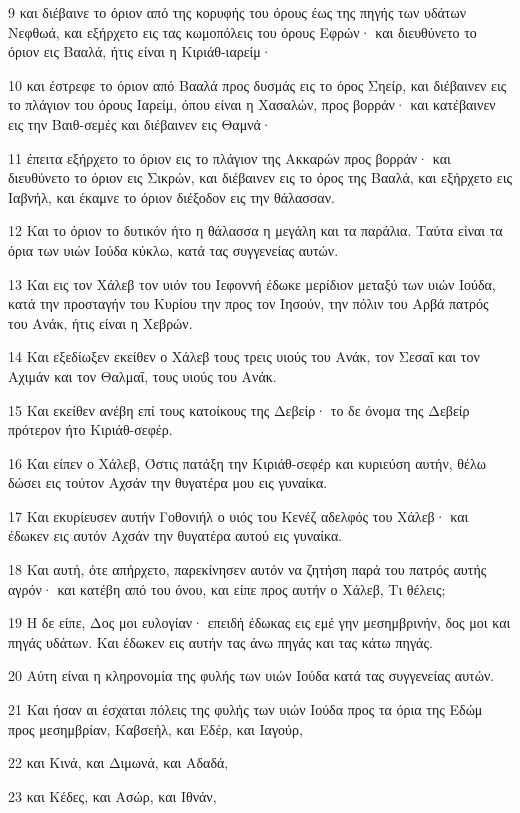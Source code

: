 \par 9 και διέβαινε το όριον από της κορυφής του όρους έως της πηγής των υδάτων Νεφθωά, και εξήρχετο εις τας κωμοπόλεις του όρους Εφρών· και διευθύνετο το όριον εις Βααλά, ήτις είναι η Κιριάθ-ιαρείμ·
\par 10 και έστρεφε το όριον από Βααλά προς δυσμάς εις το όρος Σηείρ, και διέβαινεν εις το πλάγιον του όρους Ιαρείμ, όπου είναι η Χασαλών, προς βορράν· και κατέβαινεν εις την Βαιθ-σεμές και διέβαινεν εις Θαμνά·
\par 11 έπειτα εξήρχετο το όριον εις το πλάγιον της Ακκαρών προς βορράν· και διευθύνετο το όριον εις Σικρών, και διέβαινεν εις το όρος της Βααλά, και εξήρχετο εις Ιαβνήλ, και έκαμνε το όριον διέξοδον εις την θάλασσαν.
\par 12 Και το όριον το δυτικόν ήτο η θάλασσα η μεγάλη και τα παράλια. Ταύτα είναι τα όρια των υιών Ιούδα κύκλω, κατά τας συγγενείας αυτών.
\par 13 Και εις τον Χάλεβ τον υιόν του Ιεφοννή έδωκε μερίδιον μεταξύ των υιών Ιούδα, κατά την προσταγήν του Κυρίου την προς τον Ιησούν, την πόλιν του Αρβά πατρός του Ανάκ, ήτις είναι η Χεβρών.
\par 14 Και εξεδίωξεν εκείθεν ο Χάλεβ τους τρεις υιούς του Ανάκ, τον Σεσαΐ και τον Αχιμάν και τον Θαλμαΐ, τους υιούς του Ανάκ.
\par 15 Και εκείθεν ανέβη επί τους κατοίκους της Δεβείρ· το δε όνομα της Δεβείρ πρότερον ήτο Κιριάθ-σεφέρ.
\par 16 Και είπεν ο Χάλεβ, Όστις πατάξη την Κιριάθ-σεφέρ και κυριεύση αυτήν, θέλω δώσει εις τούτον Αχσάν την θυγατέρα μου εις γυναίκα.
\par 17 Και εκυρίευσεν αυτήν Γοθονιήλ ο υιός του Κενέζ αδελφός του Χάλεβ· και έδωκεν εις αυτόν Αχσάν την θυγατέρα αυτού εις γυναίκα.
\par 18 Και αυτή, ότε απήρχετο, παρεκίνησεν αυτόν να ζητήση παρά του πατρός αυτής αγρόν· και κατέβη από του όνου, και είπε προς αυτήν ο Χάλεβ, Τι θέλεις;
\par 19 Η δε είπε, Δος μοι ευλογίαν· επειδή έδωκας εις εμέ γην μεσημβρινήν, δος μοι και πηγάς υδάτων. Και έδωκεν εις αυτήν τας άνω πηγάς και τας κάτω πηγάς.
\par 20 Αύτη είναι η κληρονομία της φυλής των υιών Ιούδα κατά τας συγγενείας αυτών.
\par 21 Και ήσαν αι έσχαται πόλεις της φυλής των υιών Ιούδα προς τα όρια της Εδώμ προς μεσημβρίαν, Καβσεήλ, και Εδέρ, και Ιαγούρ,
\par 22 και Κινά, και Διμωνά, και Αδαδά,
\par 23 και Κέδες, και Ασώρ, και Ιθνάν,

